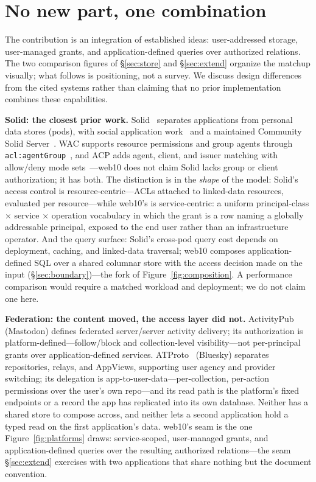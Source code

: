\documentclass[sigconf, nonacm]{acmart}
\begin{document}
\section{No new part, one combination}
\label{sec:positioning}

The contribution is an integration of established ideas: user-addressed
storage, user-managed grants, and application-defined queries over
authorized relations. The two comparison figures of
\S\ref{sec:store} and \S\ref{sec:extend} organize the matchup visually;
what follows is positioning, not a survey. We discuss design differences
from the cited systems rather than claiming that no prior implementation
combines these capabilities.

\textbf{Solid: the closest prior work.}
Solid~\cite{solid2016} separates applications from personal data stores
(pods), with social application work~\cite{solid-apps2016} and a
maintained Community Solid Server~\cite{css2024}. WAC supports resource
permissions and group agents through
\texttt{acl:agentGroup}~\cite{wac2022}, and ACP adds agent, client, and
issuer matching with allow/deny mode sets~\cite{acp2022}---web10 does
not claim Solid lacks group or client authorization; it has both. The
distinction is in the \emph{shape} of the model: Solid's access control
is resource-centric---ACLs attached to linked-data resources, evaluated
per resource---while web10's is service-centric: a uniform
principal-class $\times$ service $\times$ operation vocabulary in which
the grant is a row naming a globally addressable principal, exposed to
the end user rather than an infrastructure operator. And the query
surface: Solid's cross-pod query cost depends on deployment, caching, and
linked-data traversal; web10 composes application-defined SQL over a
shared columnar store with the access decision made on the input
(\S\ref{sec:boundary})---the fork of Figure~\ref{fig:composition}. A
performance comparison would require a matched workload and deployment;
we do not claim one here.

\textbf{Federation: the content moved, the access layer did not.}
ActivityPub~\cite{activitypub2018} (Mastodon) defines federated
server/server activity delivery; its authorization is
platform-defined---follow/block and collection-level visibility---not
per-principal grants over application-defined services.
ATProto~\cite{kleppmann2024} (Bluesky) separates repositories, relays,
and AppViews, supporting user agency and provider switching; its
delegation is app-to-user-data---per-collection, per-action permissions
over the user's own repo---and its read path is the platform's fixed
endpoints or a record the app has replicated into its own database.
Neither has a shared store to compose across, and neither lets a second
application hold a typed read on the first application's data. web10's
seam is the one Figure~\ref{fig:platforms} draws: service-scoped,
user-managed grants, and application-defined queries over the resulting
authorized relations---the seam \S\ref{sec:extend} exercises with two
applications that share nothing but the document convention.
\end{document}
